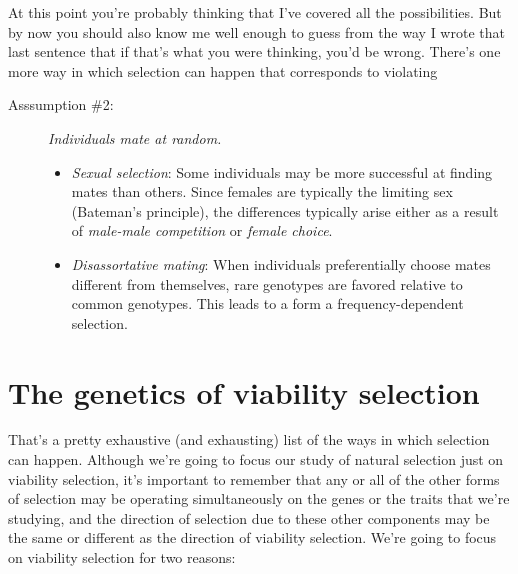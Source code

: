 At this point you're probably thinking that I've covered all the
possibilities. But by now you should also know me well enough to guess
from the way I wrote that last sentence that if that's what you were
thinking, you'd be wrong. There's one more way in which selection can
happen that corresponds to violating

\begin{description}

\item[Asssumption \#2:] {\it Individuals mate at random.}

\begin{itemize}

\item {\it Sexual selection\/}: Some individuals may be more
  successful at finding mates than others. Since females are typically
  the limiting sex (Bateman's principle), the differences typically
  arise either as a result of {\it male-male competition\/} or {\it
    female choice}.

\item {\it Disassortative mating\/}: When individuals preferentially
  choose mates different from themselves, rare genotypes are favored
  relative to common genotypes. This leads to a form a
  frequency-dependent selection.

\end{itemize}

\end{description}

\section*{The genetics of viability selection}

That's a pretty exhaustive (and exhausting) list of the ways in which
selection can happen. Although we're going to focus our study of
natural selection just on viability selection, it's important to
remember that any or all of the other forms of selection may be
operating simultaneously on the genes or the traits that we're
studying, and the direction of selection due to these other components
may be the same or different as the direction of viability
selection. We're going to focus on viability selection for two
reasons:


